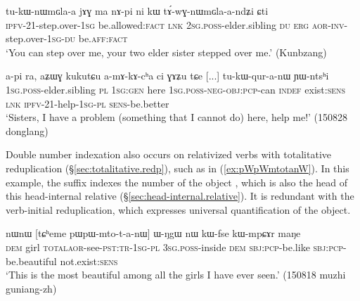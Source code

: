 \begin{exe}
\ex   \label{ex:tAwGnWmGlaandZi}
\gll tu-kɯ-nɯmɢla-a jɤɣ ma nɤ-pi ni kɯ tɤ́-wɣ-nɯmɢla-a-ndʑi ɕti \\
\textsc{ipfv}-2\fl{}1-step.over-\textsc{1sg} be.allowed:\textsc{fact} \textsc{lnk} \textsc{2sg}.\textsc{poss}-elder.sibling \textsc{du} \textsc{erg} \textsc{aor}-\textsc{inv}-step.over-\textsc{1sg}-\textsc{du} be.\textsc{aff}:\textsc{fact} \\
\glt `You can step over me, your two elder sister stepped over me.' (Kunbzang)
\end{exe}

\largerpage
\begin{exe}
\ex   \label{ex:tukWquranW.YWntshi}
\gll  a-pi ra, aʑɯɣ kukutɕu a-mɤ-kɤ-cʰa ci ɣɤʑu tɕe [...] tu-kɯ-qur-a-nɯ ɲɯ-ntsʰi \\
\textsc{1sg}.\textsc{poss}-elder.sibling \textsc{pl} \textsc{1sg}:\textsc{gen} here \textsc{1sg}.\textsc{poss}-\textsc{neg}-\textsc{obj}:\textsc{pcp}-can \textsc{indef} exist:\textsc{sens} \textsc{lnk} { } \textsc{ipfv}-2\fl{}1-help-\textsc{1sg}-\textsc{pl} \textsc{sens}-be.better \\
\glt `Sisters, I have a problem (something that I cannot do) here, help me!' (150828 donglang)
\end{exe}

Double number indexation also occurs on relativized verbs with totalitative reduplication (§\ref{sec:totalitative.redp}),  such as  in (\ref{ex:pWpWmtotanW}). In this example, the suffix  indexes the number of the object , which is also the head of this head-internal relative (§\ref{sec:head-internal.relative}). It is redundant with the verb-initial reduplication, which expresses universal quantification of the object.

\begin{exe}
\ex   \label{ex:pWpWmtotanW}
\gll nɯnɯ [tɕʰeme pɯ\redp{}pɯ-mto-t-a-nɯ] ɯ-ŋgɯ nɯ kɯ-fse kɯ-mpɕɤr maŋe \\
\textsc{dem} girl \textsc{total}\redp{}\textsc{aor}-see-\textsc{pst}:\textsc{tr}-\textsc{1sg}-\textsc{pl} \textsc{3sg}.\textsc{poss}-inside \textsc{dem} \textsc{sbj}:\textsc{pcp}-be.like \textsc{sbj}:\textsc{pcp}-be.beautiful not.exist:\textsc{sens} \\
\glt `This is the most beautiful among all the girls I have ever seen.' (150818 muzhi guniang-zh)
\end{exe}

